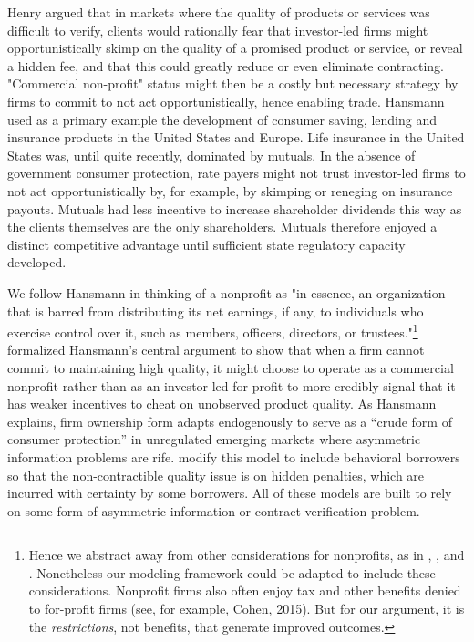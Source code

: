 \documentclass[11pt,english]{article}
\theoremstyle{plain}
\theoremstyle{definition}
\begin{document}
Henry \citet{hansmann1996a} argued that in markets where the
quality of products or services was difficult to verify, clients
would rationally fear that investor-led firms might opportunistically
skimp on the quality of a promised product or service, or reveal a
hidden fee, and that this could greatly reduce or even eliminate contracting. "Commercial non-profit" status might then be a
costly but necessary strategy by firms to commit to not act opportunistically,
hence enabling trade.
Hansmann used as a primary example the development of
consumer saving, lending and insurance products in the United States
and Europe. Life insurance in the United States was, until
quite recently, dominated by mutuals. In the absence of government consumer protection, rate payers might
not trust investor-led firms to not act  opportunistically by, for
example, by skimping or reneging on insurance
payouts. Mutuals  had less incentive to  increase shareholder dividends this way as the clients themselves are the
only shareholders. Mutuals therefore enjoyed a distinct competitive
advantage until sufficient state regulatory capacity developed.

We follow Hansmann in thinking of a nonprofit as "in
essence, an organization that is barred from distributing its net
earnings, if any, to individuals who exercise control over it, such
as members, officers, directors, or trustees."\footnote{Hence we abstract away from other considerations for nonprofits, as
in \citet{besley2005}, \citet{mcintosh2005}, and \citet{guha2013}.
Nonetheless our modeling framework could be adapted to include these
considerations. Nonprofit firms also often enjoy tax and other benefits denied to for-profit firms (see, for example, Cohen, 2015). But for
our argument, it is the \textit{restrictions},
not benefits, that generate improved outcomes.} \citet{glaeser2001} formalized Hansmann's central argument
to show that when a firm cannot commit to maintaining high quality,
it might choose to operate as a commercial nonprofit rather than as
an investor-led for-profit to more credibly signal that it has
weaker incentives to cheat on unobserved product
quality. As Hansmann explains, firm ownership form adapts endogenously
to serve as a ``crude form of consumer protection'' in unregulated emerging
markets where asymmetric information problems are rife. \citet{bubb2013}
modify this model to include behavioral borrowers so that the non-contractible quality issue is on
hidden penalties, which are incurred with certainty by some borrowers.
All of these models are built to rely on some form of asymmetric information
or contract verification problem.
\end{document}

